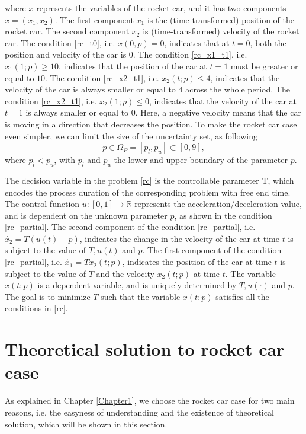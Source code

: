 where $x$ represents the variables of the rocket car, and it has two components $ x = (x_1, x_2)$. The first component $x_1$ is the (time-transformed) position of the rocket car. The second component $x_2$ is (time-transformed) velocity of the rocket car. The condition \ref{rc_t0}, i.e. $x(0,p) = 0$, indicates that at $t=0$, both the position and velocity of the car is $0$. The condition \ref{rc_x1_t1}, i.e. $x_1(1;p) \geq 10$, indicates that the position of the car at $t=1$ must be greater or equal to $10$. The condition \ref{rc_x2_t1}, i.e. $x_2(t;p) \leq 4$, indicates that the velocity of the car is always smaller or equal to 4 across the whole period. The condition \ref{rc_x2_t1}, i.e. $x_2(1;p) \leq 0$, indicates that the velocity of the car at $t=1$ is always smaller or equal to $0$. Here, a negative velocity means that the car is moving in a direction that decreases the position. To make the rocket car case even simpler, we can limit the size of the uncertainty set, as following
\begin{equation}
	p \in \Omega_P = [p_l, p_u] \subset [0,9],
\end{equation}
where $p_l < p_u$, with $p_l$ and $p_u$ the lower and upper boundary of the parameter $p$.  

The decision variable in the problem \ref{rc} is the controllable parameter T, which encodes the process duration of the corresponding problem with free end time. The control function $ u: [0,1] \rightarrow \mathbb{R}$ represents the acceleration/deceleration value, and is dependent on the unknown parameter $p$, as shown in the condition \ref{rc_partial}. The second component of the condition \ref{rc_partial}, i.e. $\dot{x_2} = T (u(t)-p)$, indicates the change in the velocity of the car at time $t$ is subject to the value of $T, u(t)$ and $p$. The first component of the condition \ref{rc_partial}, i.e. $\dot{x_1} = Tx_2(t;p)$, indicates the position of the car at time $t$ is subject to the value of $T$ and the velocity $x_2(t;p)$ at time $t$. The variable $x(t:p)$ is a dependent variable, and is uniquely determined by $T, u(\cdot)$ and $p$. The goal is to minimize $T$ such that the variable $x(t:p)$ satisfies all the conditions in \ref{rc}. 

\section{Theoretical solution to rocket car case}
As explained in Chapter \ref{Chapter1}, we choose the rocket car case for two main reasons, i.e. the easyness of understanding and the existence of theoretical solution, which will be shown in this section. 



